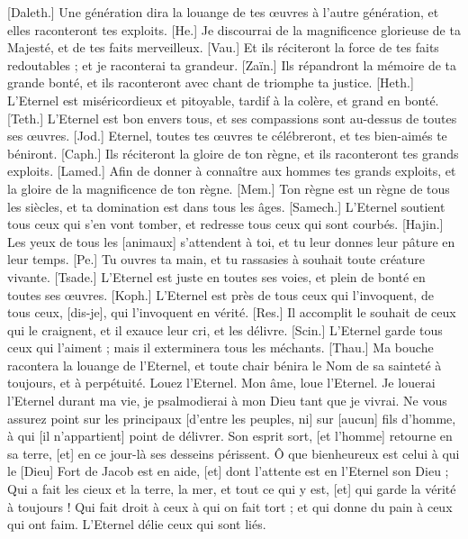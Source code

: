 \begin{multicols}{2}
[Daleth.] Une génération dira la louange de tes œuvres à l'autre génération, et elles raconteront tes exploits.
[He.] Je discourrai de la magnificence glorieuse de ta Majesté, et de tes faits merveilleux.
[Vau.] Et ils réciteront la force de tes faits redoutables ; et je raconterai ta grandeur.
[Zaïn.] Ils répandront la mémoire de ta grande bonté, et ils raconteront avec chant de triomphe ta justice.
[Heth.] L'Eternel est miséricordieux et pitoyable, tardif à la colère, et grand en bonté.
[Teth.] L'Eternel est bon envers tous, et ses compassions sont au-dessus de toutes ses œuvres.
[Jod.] Eternel, toutes tes œuvres te célébreront, et tes bien-aimés te béniront.
[Caph.] Ils réciteront la gloire de ton règne, et ils raconteront tes grands exploits.
[Lamed.] Afin de donner à connaître aux hommes tes grands exploits, et la gloire de la magnificence de ton règne.
[Mem.] Ton règne est un règne de tous les siècles, et ta domination est dans tous les âges.
[Samech.] L'Eternel soutient tous ceux qui s'en vont tomber, et redresse tous ceux qui sont courbés.
[Hajin.] Les yeux de tous les [animaux] s'attendent à toi, et tu leur donnes leur pâture en leur temps.
[Pe.] Tu ouvres ta main, et tu rassasies à souhait toute créature vivante.
[Tsade.] L'Eternel est juste en toutes ses voies, et plein de bonté en toutes ses œuvres.
[Koph.] L'Eternel est près de tous ceux qui l'invoquent, de tous ceux, [dis-je], qui l'invoquent en vérité.
[Res.] Il accomplit le souhait de ceux qui le craignent, et il exauce leur cri, et les délivre.
[Scin.] L'Eternel garde tous ceux qui l'aiment ; mais il exterminera tous les méchants.
[Thau.] Ma bouche racontera la louange de l'Eternel, et toute chair bénira le Nom de sa sainteté à toujours, et à perpétuité.
\VerseOne{}Louez l'Eternel. Mon âme, loue l'Eternel.
Je louerai l'Eternel durant ma vie, je psalmodierai à mon Dieu tant que je vivrai.
Ne vous assurez point sur les principaux [d'entre les peuples, ni] sur [aucun] fils d'homme, à qui [il n'appartient] point de délivrer.
Son esprit sort, [et l'homme] retourne en sa terre, [et] en ce jour-là ses desseins périssent.
Ô que bienheureux est celui à qui le [Dieu] Fort de Jacob est en aide, [et] dont l'attente est en l'Eternel son Dieu ;
Qui a fait les cieux et la terre, la mer, et tout ce qui y est, [et] qui garde la vérité à toujours !
Qui fait droit à ceux à qui on fait tort ; et qui donne du pain à ceux qui ont faim. L'Eternel délie ceux qui sont liés.

\end{multicols}

